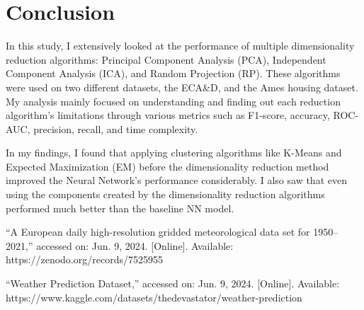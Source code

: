 \documentclass[conference]{IEEEtran}
\begin{document}
\section{Conclusion}
In this study, I extensively looked at the performance of multiple dimensionality reduction algorithms: Principal Component Analysis (PCA), Independent Component Analysis (ICA), and Random Projection (RP). These algorithms were used on two different datasets, the ECA\&D, and the Ames housing dataset. My analysis mainly focused on understanding and finding out each reduction algorithm's limitations through various metrics such as F1-score, accuracy, ROC-AUC, precision, recall, and time complexity.
\par In my findings, I found that applying clustering algorithms like K-Means and Expected Maximization (EM) before the dimensionality reduction method improved the Neural Network's performance considerably. I also saw that even using the components created by the dimensionality reduction algorithms performed much better than the baseline NN model. 


\begin{thebibliography}{1}

``A European daily high-resolution gridded meteorological data set for 1950–2021,'' accessed on: Jun. 9, 2024. [Online]. Available: https://zenodo.org/records/7525955

``Weather Prediction Dataset,'' accessed on: Jun. 9, 2024. [Online]. Available: https://www.kaggle.com/datasets/thedevastator/weather-prediction

\end{thebibliography}
\end{document}
